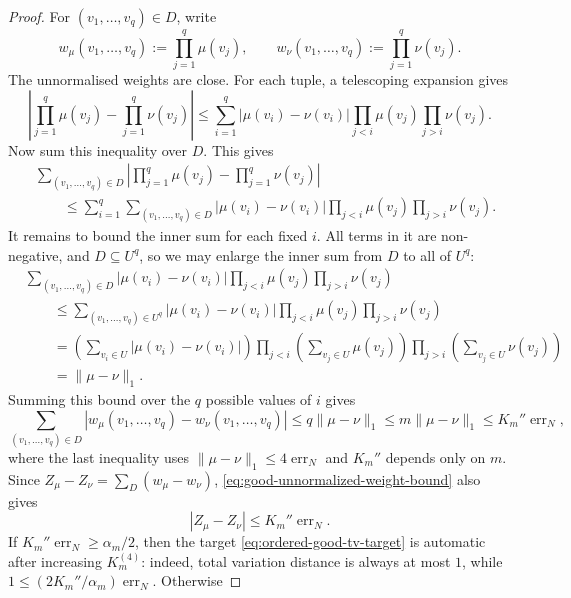 \documentclass[11pt]{article}
\theoremstyle{definition}
\begin{document}
\begin{proof}
For $(v_1,\ldots,v_q)\in D$, write
\[
  w_\mu(v_1,\ldots,v_q):=\prod_{j=1}^q\mu(v_j),
  \qquad
  w_\nu(v_1,\ldots,v_q):=\prod_{j=1}^q\nu(v_j).
\]
The unnormalised weights are close.  For each tuple, a telescoping expansion gives
\[
  \left|
    \prod_{j=1}^q\mu(v_j)-\prod_{j=1}^q\nu(v_j)
  \right|
  \le
  \sum_{i=1}^q
  |\mu(v_i)-\nu(v_i)|
  \prod_{j<i}\mu(v_j)\prod_{j>i}\nu(v_j).
\]
Now sum this inequality over $D$.  This gives
\[
\begin{aligned}
&\sum_{(v_1,\ldots,v_q)\in D}
  \left|
    \prod_{j=1}^q\mu(v_j)-\prod_{j=1}^q\nu(v_j)
  \right|  \\
&\qquad\le
  \sum_{i=1}^q
  \sum_{(v_1,\ldots,v_q)\in D}
  |\mu(v_i)-\nu(v_i)|
  \prod_{j<i}\mu(v_j)\prod_{j>i}\nu(v_j).
\end{aligned}
\]
It remains to bound the inner sum for each fixed $i$.  All terms in it are
non-negative, and $D\subseteq U^q$, so we may enlarge the inner sum from $D$ to
all of $U^q$:
\[
\begin{aligned}
&\sum_{(v_1,\ldots,v_q)\in D}
  |\mu(v_i)-\nu(v_i)|
  \prod_{j<i}\mu(v_j)\prod_{j>i}\nu(v_j)  \\
&\qquad\le
  \sum_{(v_1,\ldots,v_q)\in U^q}
  |\mu(v_i)-\nu(v_i)|
  \prod_{j<i}\mu(v_j)\prod_{j>i}\nu(v_j)  \\
&\qquad=
  \left(\sum_{v_i\in U}|\mu(v_i)-\nu(v_i)|\right)
  \prod_{j<i}\left(\sum_{v_j\in U}\mu(v_j)\right)
  \prod_{j>i}\left(\sum_{v_j\in U}\nu(v_j)\right)  \\
&\qquad=
  \|\mu-\nu\|_1 .
\end{aligned}
\]
Summing this bound over the $q$ possible values of $i$ gives
\begin{equation}\label{eq:good-unnormalized-weight-bound}
  \sum_{(v_1,\ldots,v_q)\in D}
  |w_\mu(v_1,\ldots,v_q)-w_\nu(v_1,\ldots,v_q)|
  \le
  q\|\mu-\nu\|_1
  \le
  m\|\mu-\nu\|_1
  \le
  K_m''\operatorname{err}_N,
\end{equation}
where the last inequality uses $\|\mu-\nu\|_1\le4\operatorname{err}_N$ and
$K_m''$ depends only on $m$.  Since
$Z_\mu-Z_\nu=\sum_D(w_\mu-w_\nu)$, \eqref{eq:good-unnormalized-weight-bound} also gives
\begin{equation}\label{eq:good-normalizer-bound}
  |Z_\mu-Z_\nu|\le K_m''\operatorname{err}_N .
\end{equation}
If
$K_m''\operatorname{err}_N\ge\alpha_m/2$, then the target
\eqref{eq:ordered-good-tv-target} is automatic after increasing $K_m^{(4)}$:
indeed, total variation distance is always at most $1$, while
$1\le (2K_m''/\alpha_m)\operatorname{err}_N$.  Otherwise

\end{proof}
\end{document}
